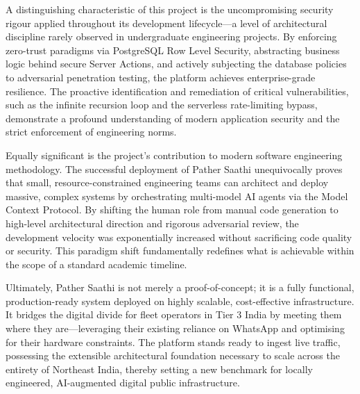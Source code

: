 \documentclass[12pt,a4paper]{report}
\begin{document}
A distinguishing characteristic of this project is the uncompromising security rigour applied throughout its development lifecycle---a level of architectural discipline rarely observed in undergraduate engineering projects. By enforcing zero-trust paradigms via PostgreSQL Row Level Security, abstracting business logic behind secure Server Actions, and actively subjecting the database policies to adversarial penetration testing, the platform achieves enterprise-grade resilience. The proactive identification and remediation of critical vulnerabilities, such as the infinite recursion loop and the serverless rate-limiting bypass, demonstrate a profound understanding of modern application security and the strict enforcement of engineering norms.

Equally significant is the project's contribution to modern software engineering methodology. The successful deployment of Pather Saathi unequivocally proves that small, resource-constrained engineering teams can architect and deploy massive, complex systems by orchestrating multi-model AI agents via the Model Context Protocol. By shifting the human role from manual code generation to high-level architectural direction and rigorous adversarial review, the development velocity was exponentially increased without sacrificing code quality or security. This paradigm shift fundamentally redefines what is achievable within the scope of a standard academic timeline.

Ultimately, Pather Saathi is not merely a proof-of-concept; it is a fully functional, production-ready system deployed on highly scalable, cost-effective infrastructure. It bridges the digital divide for fleet operators in Tier 3 India by meeting them where they are---leveraging their existing reliance on WhatsApp and optimising for their hardware constraints. The platform stands ready to ingest live traffic, possessing the extensible architectural foundation necessary to scale across the entirety of Northeast India, thereby setting a new benchmark for locally engineered, AI-augmented digital public infrastructure.
\end{document}
